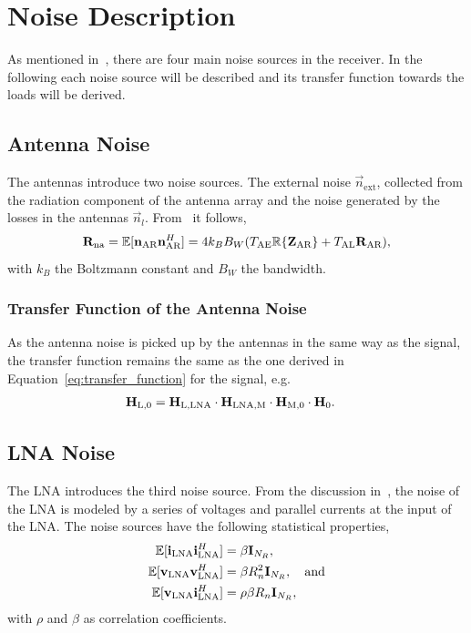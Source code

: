\section{Noise Description}
\label{sec:noise_description}

As mentioned in~\cite{Yahia2013}, there are four main noise sources in the receiver.
In the following each noise source will be described and its transfer function towards the loads will be derived. 

\subsection{Antenna Noise}
\label{sec:antenna_noise}

The antennas introduce two noise sources.
The external noise $\vec{n}_\text{ext}$, collected from the radiation component of the antenna array and the noise generated by the losses in the antennas $\vec{n}_l$.
From~\cite{Twiss1955} it follows, 
\begin{equation}
\label{eq:cov_ant}
\mathbf{R}_\text{na} = \mathbb{E}[\mathbf{n}_\text{AR}\mathbf{n}_\text{AR}^H] = 4 k_B B_W(T_\text{AE}\mathbb{R}\{\mathbf{Z}_\text{AR}\}+T_\text{AL}\mathbf{R}_\text{AR}),
\end{equation}
with $k_B$ the Boltzmann constant and $B_W$ the bandwidth.

\subsubsection{Transfer Function of the Antenna Noise}
\label{sec:antenna_noise_transf}
As the antenna noise is picked up by the antennas in the same way as the signal, the transfer function remains the same as the one derived in Equation~\eqref{eq:transfer_function} for the signal, e.g.
\begin{align}
\mathbf{H}_\text{L,0} &= \mathbf{H}_\text{L,LNA}\cdot\mathbf{H}_\text{LNA,M}\cdot\mathbf{H}_\text{M,0}\cdot\mathbf{H}_{0}.
\end{align}

\subsection{LNA Noise}
\label{sec:lna_noise}

The LNA introduces the third noise source.
From the discussion in~\cite{Nossek}, the noise of the LNA is modeled by a series of voltages and parallel currents at the input of the LNA.
The noise sources have the following statistical properties,
\begin{align}
\label{eq:cov_lna}
\mathbb{E}[\mathbf{i}_\text{LNA}\mathbf{i}_\text{LNA}^H] &= \beta \mathbf{I}_{N_R},\\\nonumber
\mathbb{E}[\mathbf{v}_\text{LNA}\mathbf{v}_\text{LNA}^H] &= \beta R_n^2\mathbf{I}_{N_R},\quad\text{and}\\\nonumber
\mathbb{E}[\mathbf{v}_\text{LNA}\mathbf{i}_\text{LNA}^H] &= \rho \beta R_n\mathbf{I}_{N_R},
\end{align}
with $\rho$ and $\beta$ as correlation coefficients.

